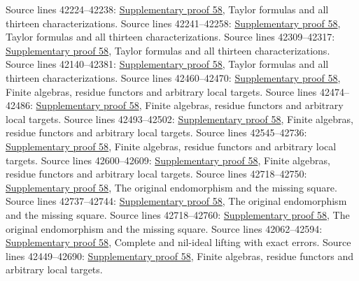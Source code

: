\begin{AlgebraSourceRoutes}
 Source lines 42224--42238: \hyperlink{algebra_henselian_notes_20260929}{Supplementary proof 58}, Taylor formulas and all thirteen characterizations.
 Source lines 42241--42258: \hyperlink{algebra_henselian_notes_20260929}{Supplementary proof 58}, Taylor formulas and all thirteen characterizations.
 Source lines 42309--42317: \hyperlink{algebra_henselian_notes_20260929}{Supplementary proof 58}, Taylor formulas and all thirteen characterizations.
 Source lines 42140--42381: \hyperlink{algebra_henselian_notes_20260929}{Supplementary proof 58}, Taylor formulas and all thirteen characterizations.
 Source lines 42460--42470: \hyperlink{algebra_henselian_notes_20260929}{Supplementary proof 58}, Finite algebras, residue functors and arbitrary local targets.
 Source lines 42474--42486: \hyperlink{algebra_henselian_notes_20260929}{Supplementary proof 58}, Finite algebras, residue functors and arbitrary local targets.
 Source lines 42493--42502: \hyperlink{algebra_henselian_notes_20260929}{Supplementary proof 58}, Finite algebras, residue functors and arbitrary local targets.
 Source lines 42545--42736: \hyperlink{algebra_henselian_notes_20260929}{Supplementary proof 58}, Finite algebras, residue functors and arbitrary local targets.
 Source lines 42600--42609: \hyperlink{algebra_henselian_notes_20260929}{Supplementary proof 58}, Finite algebras, residue functors and arbitrary local targets.
 Source lines 42718--42750: \hyperlink{algebra_henselian_notes_20260929}{Supplementary proof 58}, The original endomorphism and the missing square.
 Source lines 42737--42744: \hyperlink{algebra_henselian_notes_20260929}{Supplementary proof 58}, The original endomorphism and the missing square.
 Source lines 42718--42760: \hyperlink{algebra_henselian_notes_20260929}{Supplementary proof 58}, The original endomorphism and the missing square.
 Source lines 42062--42594: \hyperlink{algebra_henselian_notes_20260929}{Supplementary proof 58}, Complete and nil-ideal lifting with exact errors.
 Source lines 42449--42690: \hyperlink{algebra_henselian_notes_20260929}{Supplementary proof 58}, Finite algebras, residue functors and arbitrary local targets.
\end{AlgebraSourceRoutes}

